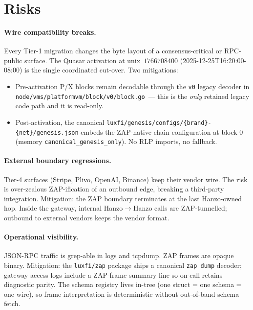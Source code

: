 \section{Risks}
\label{sec:risks}

\paragraph{Wire compatibility breaks.}
Every Tier-1 migration changes the byte layout of a consensus-critical
or RPC-public surface. The Quasar activation at unix~$1766708400$
(2025-12-25T16:20:00-08:00) is the single coordinated cut-over. Two
mitigations:
\begin{itemize}[leftmargin=*]
  \item Pre-activation P/X blocks remain decodable through the
    \texttt{v0} legacy decoder in
    \texttt{node/vms/platformvm/block/v0/block.go}~--- this is the
    \emph{only} retained legacy code path and it is read-only.
  \item Post-activation, the canonical
    \texttt{luxfi/genesis/configs/\{brand\}-\{net\}/genesis.json}
    embeds the ZAP-native chain configuration at block 0 (memory
    \texttt{canonical\_genesis\_only}). No RLP imports, no fallback.
\end{itemize}

\paragraph{External boundary regressions.}
Tier-4 surfaces (Stripe, Plivo, OpenAI, Binance) keep their vendor
wire. The risk is over-zealous ZAP-ification of an outbound edge,
breaking a third-party integration. Mitigation: the ZAP boundary
terminates at the last Hanzo-owned hop. Inside the gateway, internal
Hanzo$\to$Hanzo calls are ZAP-tunnelled; outbound to external vendors
keeps the vendor format.

\paragraph{Operational visibility.}
JSON-RPC traffic is grep-able in logs and tcpdump. ZAP frames are
opaque binary. Mitigation: the \texttt{luxfi/zap} package ships a
canonical \texttt{zap dump} decoder; gateway access logs include a
ZAP-frame summary line so on-call retains diagnostic parity. The
schema registry lives in-tree (one struct = one schema = one wire),
so frame interpretation is deterministic without out-of-band
schema fetch.

